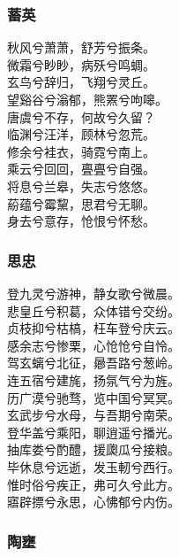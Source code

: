 \documentclass[]{article}
\begin{document}
\hypertarget{header-n3058}{%
\subsubsection{蓄英}\label{header-n3058}}

秋风兮萧萧，舒芳兮振条。\\
微霜兮眇眇，病殀兮鸣蜩。\\
玄鸟兮辞归，飞翔兮灵丘。\\
望谿谷兮滃郁，熊罴兮呴嗥。\\
唐虞兮不存，何故兮久留？\\
临渊兮汪洋，顾林兮忽荒。\\
修余兮袿衣，骑霓兮南上。\\
乘云兮回回，亹亹兮自强。\\
将息兮兰皋，失志兮悠悠。\\
蒶蕴兮霉黧，思君兮无聊。\\
身去兮意存，怆恨兮怀愁。

\hypertarget{header-n3063}{%
\subsubsection{思忠}\label{header-n3063}}

登九灵兮游神，静女歌兮微晨。\\
悲皇丘兮积葛，众体错兮交纷。\\
贞枝抑兮枯槁，枉车登兮庆云。\\
感余志兮惨栗，心怆怆兮自怜。\\
驾玄螭兮北征，曏吾路兮葱岭。\\
连五宿兮建旄，扬氛气兮为旌。\\
历广漠兮驰骛，览中国兮冥冥。\\
玄武步兮水母，与吾期兮南荣。\\
登华盖兮乘阳，聊逍遥兮播光。\\
抽库娄兮酌醴，援瓟瓜兮接粮。\\
毕休息兮远逝，发玉軔兮西行。\\
惟时俗兮疾正，弗可久兮此方。\\
寤辟摽兮永思，心怫郁兮内伤。

\hypertarget{header-n3068}{%
\subsubsection{陶壅}\label{header-n3068}}
\end{document}
